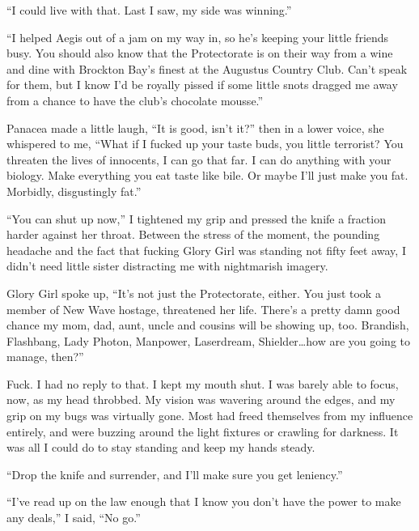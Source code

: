 ``I could live with that.  Last I saw, my side was winning.''



``I helped Aegis out of a jam on my way in, so he's keeping your little friends busy.  You should also know that the Protectorate is on their way from a wine and dine with Brockton Bay's finest at the Augustus Country Club.  Can't speak for them, but I know I'd be royally pissed if some little snots dragged me away from a chance to have the club's chocolate mousse.''



Panacea made a little laugh, ``It is good, isn't it?'' then in a lower voice, she whispered to me, ``What if I fucked up your taste buds, you little terrorist?  You threaten the lives of innocents, I can go that far.  I can do anything with your biology.  Make everything you eat taste like bile.  Or maybe I'll just make you fat.  Morbidly, disgustingly fat.''



``You can shut up now,'' I tightened my grip and pressed the knife a fraction harder against her throat.  Between the stress of the moment, the pounding headache and the fact that fucking Glory Girl was standing not fifty feet away, I didn't need little sister distracting me with nightmarish imagery.



Glory Girl spoke up, ``It's not just the Protectorate, either.  You just took a member of New Wave hostage, threatened her life.  There's a pretty damn good chance my mom, dad, aunt, uncle and cousins will be showing up, too.  Brandish, Flashbang, Lady Photon, Manpower, Laserdream, Shielder\ldots how are you going to manage, then?''



Fuck.  I had no reply to that.  I kept my mouth shut.  I was barely able to focus, now, as my head throbbed.  My vision was wavering around the edges, and my grip on my bugs was virtually gone.  Most had freed themselves from my influence entirely, and were buzzing around the light fixtures or crawling for darkness.  It was all I could do to stay standing and keep my hands steady.



``Drop the knife and surrender, and I'll make sure you get leniency.''



``I've read up on the law enough that I know you don't have the power to make any deals,'' I said, ``No go.''



